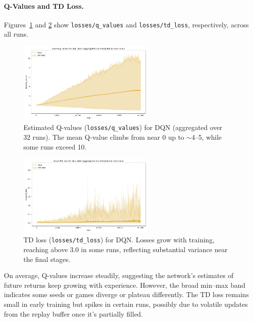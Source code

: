 \paragraph{Q-Values and TD Loss.}
Figures~\ref{fig:dqn_q_values} and \ref{fig:dqn_td_loss} show \texttt{losses/q\_values} and 
\texttt{losses/td\_loss}, respectively, across all runs.

\begin{figure}[htbp]
	\centering
	\includegraphics[width=0.6\textwidth]{figures/dqn/losses_q_values_dqn_atari.png}
	\caption{Estimated Q-values (\texttt{losses/q\_values}) for DQN 
		(aggregated over 32 runs). 
		The mean Q-value climbs from near 0 up to \(\sim\)4--5, 
		while some runs exceed 10.}
	\label{fig:dqn_q_values}
\end{figure}

\begin{figure}[htbp]
	\centering
	\includegraphics[width=0.6\textwidth]{figures/dqn/losses_td_loss_dqn_atari.png}
	\caption{TD loss (\texttt{losses/td\_loss}) for DQN. 
		Losses grow with training, reaching above 3.0 in some runs, 
		reflecting substantial variance near the final stages.}
	\label{fig:dqn_td_loss}
\end{figure}

On average, Q-values increase steadily, suggesting the network’s estimates 
of future returns keep growing with experience. However, 
the broad min--max band indicates some seeds or games diverge or plateau differently. 
The TD loss remains small in early training but spikes in certain runs, 
possibly due to volatile updates from the replay buffer once it’s partially filled.

